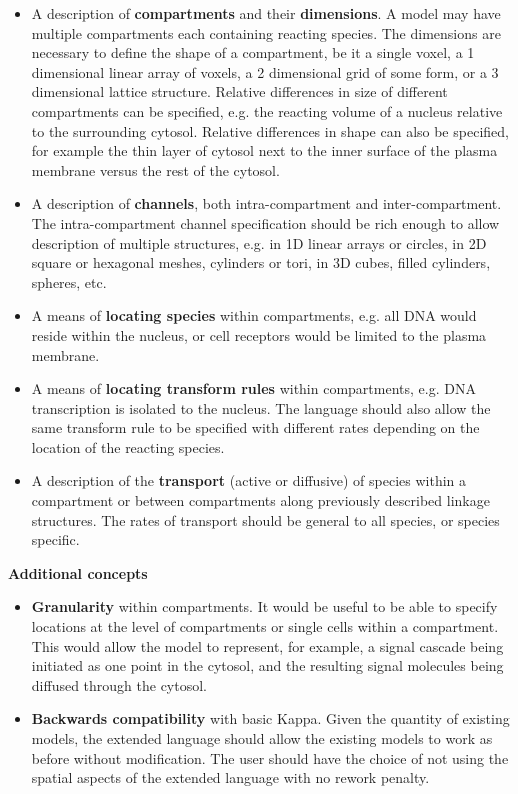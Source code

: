 \begin{itemize}
 \item A description of \textbf{compartments} and their \textbf{dimensions}. A model may have multiple compartments each containing reacting species. The dimensions are necessary to define the shape of a compartment, be it a single voxel, a 1 dimensional linear array of voxels, a 2 dimensional grid of some form, or a 3 dimensional lattice structure. Relative differences in size of different compartments can be specified, e.g. the reacting volume of a nucleus relative to the surrounding cytosol. Relative differences in shape can also be specified, for example the thin layer of cytosol next to the inner surface of the plasma membrane versus the rest of the cytosol.

 \item A description of \textbf{channels}, both intra-compartment and inter-compartment. The intra-compartment channel specification should be rich enough to allow description of multiple structures, e.g. in 1D linear arrays or circles, in 2D square or hexagonal meshes, cylinders or tori, in 3D cubes, filled cylinders, spheres, etc.

 \item A means of \textbf{locating species} within compartments, e.g. all DNA would reside within the nucleus, or cell receptors would be limited to the plasma membrane.

 \item A means of \textbf{locating transform rules} within compartments, e.g. DNA transcription is isolated to the nucleus. The language should also allow the same transform rule to be specified with different rates depending on the location of the reacting species.

 \item A description of the \textbf{transport} (active or diffusive) of species within a compartment or between compartments along previously described linkage structures. The rates of transport should be general to all species, or species specific.

\end{itemize}


\textbf{Additional concepts}

\begin{itemize}
 \item \textbf{Granularity} within compartments. It would be useful to be able to specify locations at the level of compartments or single cells within a compartment. This would allow the model to represent, for example, a signal cascade being initiated as one point in the cytosol, and the resulting signal molecules being diffused through the cytosol. 

 \item \textbf{Backwards compatibility} with basic Kappa. Given the quantity of existing models, the extended language should allow the existing models to work as before without modification. The user should have the choice of not using the spatial aspects of the extended language with no rework penalty.

\end{itemize}


